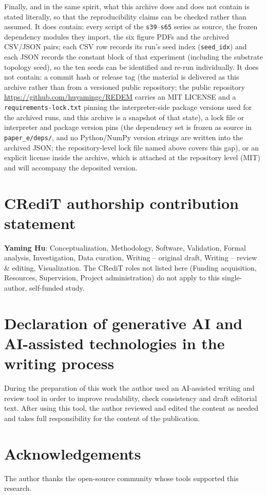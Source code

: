 \documentclass[preprint,12pt]{elsarticle}
\begin{document}
Finally, and in the same
spirit, what this archive does and does not contain is stated literally, so
that the reproducibility claims can be checked rather than assumed. It does contain: every script of the
\texttt{s39}--\texttt{s65} series as source, the frozen dependency modules they
import, the six figure PDFs and the archived CSV/JSON pairs; each CSV row
records its run's seed index (\texttt{seed\_idx}) and each JSON records the
constant block of that experiment (including the substrate topology seed), so
the ten seeds can be identified and re-run individually. It does not contain:
a commit hash or release tag (the material is delivered as this archive rather
than from a versioned public repository; the public repository
\url{https://github.com/huyamingc/REDEM} carries an MIT LICENSE and a
\texttt{requirements-lock.txt} pinning the interpreter-side package versions
used for the archived runs, and this archive is a snapshot of that state), a lock file or interpreter and
package version pins (the dependency set is frozen as source in
\texttt{paper\_e/deps/}, and no Python/NumPy version strings are written into
the archived JSON; the repository-level lock file named above covers this
gap), or an explicit license inside the archive, which is attached at the
repository level (MIT) and will accompany the deposited version.

\section*{CRediT authorship contribution statement}
\textbf{Yaming Hu}: Conceptualization, Methodology, Software, Validation,
Formal analysis, Investigation, Data curation, Writing -- original draft,
Writing -- review \& editing, Visualization. The CRediT roles not listed
here (Funding acquisition, Resources, Supervision, Project administration) do
not apply to this single-author, self-funded study.

\section*{Declaration of generative AI and AI-assisted technologies in the
writing process}
During the preparation of this work the author used an AI-assisted
writing and review tool in order to improve readability, check consistency
and draft editorial text. After using this tool, the author reviewed and
edited the content as needed and takes full responsibility for the content of
the publication.

\section*{Acknowledgements}
The author thanks the open-source community whose tools supported this
research.
\end{document}
